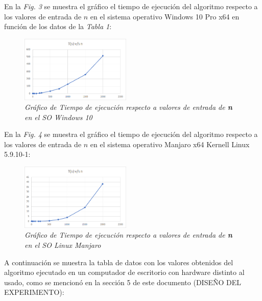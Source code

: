 \documentclass[11pt, twocolumn]{llncs}
\begin{document}
En la \textit{Fig. 3} se muestra el gráfico el tiempo de ejecución del algoritmo respecto a los valores de entrada de $n$ en el sistema operativo Windows 10 Pro x64 en función de los datos de la \textit{Tabla 1}:

\begin{figure}[H]
\caption{\textit{\label{fig:grafico1}Gráfico de Tiempo de ejecución respecto a valores de entrada de \textbf{n} en el SO Windows 10}}
\centering
\includegraphics[width=0.47\textwidth]{imagenes/grafico_1.png}
\end{figure}

En la \textit{Fig. 4} se muestra el gráfico el tiempo de ejecución del algoritmo respecto a los valores de entrada de $n$ en el sistema operativo Manjaro x64 Kernell Linux 5.9.10-1:

\begin{figure}[H]
\caption{\textit{\label{fig:grafico2}Gráfico de Tiempo de ejecución respecto a valores de entrada de \textbf{n} en el SO Linux Manjaro}}
\centering
\includegraphics[width=0.47\textwidth]{imagenes/grafico_2.png}
\end{figure}

A continuación se muestra la tabla de datos con los valores obtenidos del algoritmo ejecutado en un computador de escritorio con hardware distinto al usado, como se mencionó en la sección 5 de este documento (DISEÑO DEL EXPERIMENTO):
\end{document}
